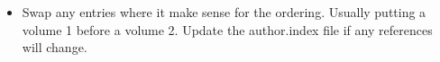 \documentclass{article}
\begin{document}
\begin{itemize}
\begin{verbatim}
\hspace{2em}``In remb: of our trip together in the `City of Paris'

\hspace{2em}To Samuel Goodman Esqr.

\hspace{2em}with the best wishes of

\hspace{2em}T. Reginald Jones
\end{verbatim}

  \item Swap any entries where it make sense for the ordering. Usually
    putting a volume 1 before a volume 2.  Update the author.index
    file if any references will change.

\end{itemize}
\end{document}
